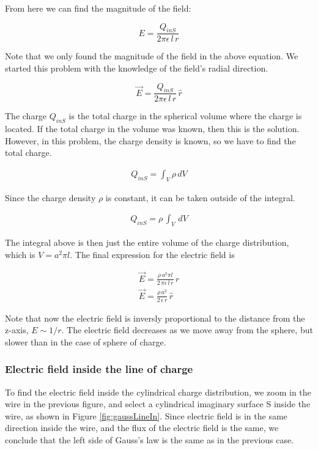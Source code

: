 \documentclass{ximera}
\begin{document}
From here we can find the magnitude of the field:


\begin{equation}
 E  = \frac{Q_{inS}}{2 \pi  \epsilon \, l\, r}
\end{equation}

Note that we only found the magnitude of the field in the above equation. We started this problem with the knowledge of the field's radial direction. 

\begin{equation}
 \vec{E}  = \frac{Q_{inS}}{2 \pi  \epsilon \, l\, r} \, \hat{r}
\end{equation}

 The charge $Q_{inS}$ is the total charge in the spherical volume where the charge is located. If the total charge in the volume was known, then this is the solution. However, in this problem, the charge density is known, so we have to find the total charge.

\begin{eqnarray}
Q_{inS}=\int_V \rho \, dV
\end{eqnarray}

Since the charge density $\rho$ is constant, it  can be taken outside of the integral.


\begin{eqnarray}
Q_{inS}=\rho \, \int_V \, dV
\end{eqnarray}

The integral above is then just the entire volume of the charge distribution, which is $V= a^2 \pi l$. The final expression for the electric field is 


\begin{eqnarray}
 \vec{E}  = \frac{\rho \, a^2 \pi l }{2 \, \pi  \epsilon \, l \,r} \, \hat{r} \\
 \vec{E}  = \frac{\rho \,   a^2}{2 \, \epsilon \, r} \, \hat{r}
\end{eqnarray}


Note that now the electric field is inversly proportional to the   distance from the z-axis, $E \sim 1/r$. The electric field decreases as we move away from the sphere, but slower than in the case of sphere of charge.


\subsubsection{Electric field inside the line of charge}

To find the electric field inside the cylindrical charge distribution, we zoom in the wire in the previous figure, and select a cylindrical imaginary surface S inside the wire, as shown in Figure \ref{fig:gaussLineIn}. Since electric field is in the same direction inside the wire, and the flux of the electric field is the same, we conclude that the left side of Gauss's law is the same as in the previous case. 
\end{document}
